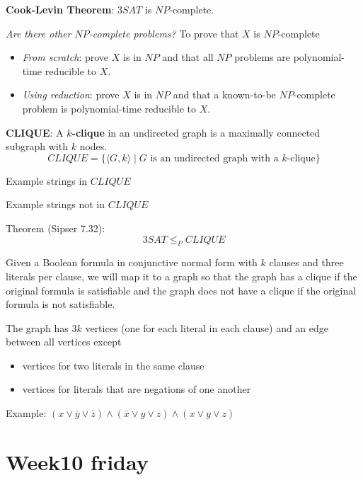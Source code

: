 \documentclass[12pt, oneside]{article}
\begin{document}
{\bf Cook-Levin Theorem}: $3SAT$ is $NP$-complete.


{\it Are there other $NP$-complete problems?} To prove that $X$ is $NP$-complete
\begin{itemize}
\item {\it From scratch}: prove $X$ is in $NP$ and that all $NP$ problems are polynomial-time
reducible to $X$.
\item {\it Using reduction}: prove $X$ is in $NP$ and that a known-to-be $NP$-complete problem 
is polynomial-time reducible to $X$.
\end{itemize}

\vfill
\vfill


\newpage

{\bf CLIQUE}: A {\bf $k$-clique} in an undirected graph is a maximally connected subgraph with $k$  nodes.
\[
CLIQUE  = \{  \langle G, k \rangle \mid \text{$G$ is an  undirected graph with  a $k$-clique} \}
\]


Example strings  in $CLIQUE$

\vfill

Example  strings not  in $CLIQUE$

\vfill

Theorem (Sipser 7.32):
\[
3SAT  \leq_P CLIQUE
\]

Given a Boolean formula in conjunctive normal form with $k$ clauses and three literals per clause, we will 
map it to a graph so that the graph has a clique if the original formula is satisfiable and the 
graph does not have a clique if the original formula is not satisfiable.

The graph has $3k$ vertices (one for each literal in each clause) and an edge between all vertices except
\begin{itemize}
    \item vertices for two literals in the same clause
    \item vertices for literals that are negations of one another
\end{itemize}

Example: $(x \vee \bar{y} \vee {\bar z}) \wedge (\bar{x}  \vee y  \vee  z) \wedge (x \vee y  \vee z)$

\vfill

\newpage
 \vfill
\section*{Week10 friday}
\end{document}
